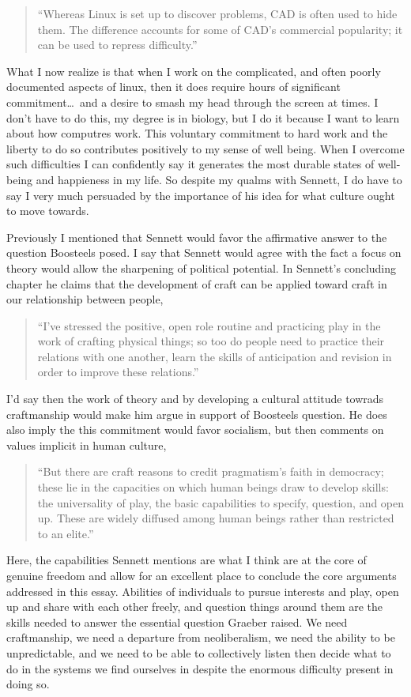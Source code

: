 \documentclass[12pt,a4paper]{article}
\begin{document}
\begin{quote}\color{G-Moon}
   ``Whereas Linux is set up to discover problems, CAD is often used to hide them. The difference accounts for some of CAD’s commercial popularity; it can be used to repress difficulty.''~\cite{craft}
\end{quote}
What I now realize is that when I work on the complicated, and often poorly documented aspects of linux, then it does require hours of significant commitment\ldots~and a desire to smash my head through the screen at times. I don't have to do this, my degree is in biology, but I do it because I want to learn about how computres work. This voluntary commitment to hard work and the liberty to do so contributes positively to my sense of well being. When I overcome such difficulties I can confidently say it generates the most durable states of well-being and happieness in my life. So despite my qualms with Sennett, I do have to say I very much persuaded by the importance of his idea for what culture ought to move towards.

Previously I mentioned that Sennett would favor the affirmative answer to the question Boosteels posed. I say that Sennett would agree with the fact a focus on theory would allow the sharpening of political potential. In Sennett's concluding chapter he claims that the development of craft can be applied toward craft in our relationship between people,
\begin{quote}\color{G-Moon}
   ``I’ve stressed the positive, open role 
routine and practicing play in the work of crafting physical 
things; so too do people need to practice their relations 
with one another, learn the skills of anticipation and 
revision in order to improve these relations.''~\cite{craft}
\end{quote}
I'd say then the work of theory and by developing a cultural attitude towrads craftmanship would make him argue in support of Boosteels question. He does also imply the this commitment would favor socialism, but then comments on values implicit in human culture,
\begin{quote}\color{G-Moon}
``But there are craft reasons to credit pragmatism’s faith in democracy; 
these lie in the capacities on which human beings draw to 
develop skills: the universality of play, the basic 
capabilities to specify, question, and open up. These are 
widely diffused among human beings rather than restricted 
to an elite.''~\cite{craft}
\end{quote}
Here, the capabilities Sennett mentions are what I think are at the core of genuine freedom and allow for an excellent place to conclude the core arguments addressed in this essay. Abilities of individuals to pursue interests and play, open up and share with each other freely, and question things around them are the skills needed to answer the essential question Graeber raised. We need craftmanship, we need a departure from neoliberalism, we need the ability to be unpredictable, and we need to be able to collectively listen then decide what to do in the systems we find ourselves in despite the enormous difficulty present in doing so. 
\clearpage


\end{document}
